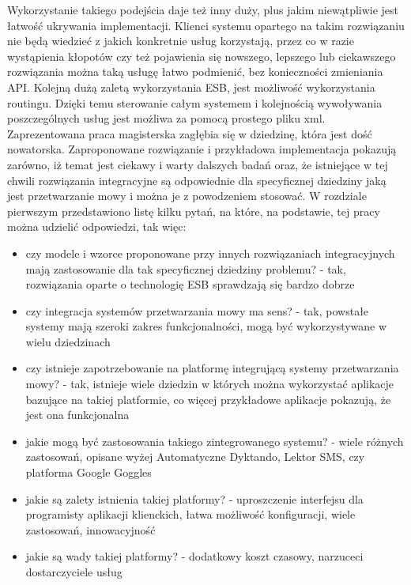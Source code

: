 Wykorzystanie takiego podejścia daje też inny duży, plus jakim niewątpliwie jest łatwość ukrywania implementacji. Klienci systemu opartego na takim rozwiązaniu nie będą wiedzieć z jakich konkretnie usług korzystają, przez co w razie wystąpienia kłopotów czy też pojawienia się nowszego, lepszego lub ciekawszego rozwiązania można taką usługę łatwo podmienić, bez konieczności zmieniania API. Kolejną dużą zaletą wykorzystania ESB, jest możliwość wykorzystania routingu. Dzięki temu sterowanie całym systemem i kolejnością wywoływania poszczególnych usług jest możliwa za pomocą prostego pliku xml.  \\
Zaprezentowana praca magisterska zagłębia się w dziedzinę, która jest dość nowatorska. Zaproponowane rozwiązanie i przykładowa implementacja pokazują zarówno, iż temat jest ciekawy i warty dalszych badań oraz, że istniejące w tej chwili rozwiązania integracyjne są odpowiednie dla specyficznej dziedziny jaką jest przetwarzanie mowy i można je z powodzeniem stosować. W rozdziale pierwszym przedstawiono listę kilku pytań, na które, na podstawie, tej pracy można udzielić odpowiedzi, tak więc:
\begin{itemize}
	\item czy modele i wzorce proponowane przy innych rozwiązaniach integracyjnych mają zastosowanie dla tak specyficznej dziedziny problemu? - tak, rozwiązania oparte o technologię ESB sprawdzają się bardzo dobrze
	\item czy integracja systemów przetwarzania mowy ma sens? - tak, powstałe systemy mają szeroki zakres funkcjonalności, mogą być wykorzystywane w wielu dziedzinach
	\item czy istnieje zapotrzebowanie na platformę integrującą systemy przetwarzania mowy? - tak, istnieje wiele dziedzin w których można wykorzystać aplikacje bazujące na takiej platformie, co więcej przykładowe aplikacje pokazują, że jest ona funkcjonalna
	\item jakie mogą być zastosowania takiego zintegrowanego systemu? - wiele różnych zastosowań, opisane wyżej Automatyczne Dyktando, Lektor SMS, czy platforma Google Goggles 
	\item jakie są zalety istnienia takiej platformy? - uproszczenie interfejsu dla programisty aplikacji klienckich, łatwa możliwość konfiguracji, wiele zastosowań, innowacyjność
	\item jakie są wady takiej platformy? - dodatkowy koszt czasowy, narzuceci dostarczyciele usług
\end{itemize}







